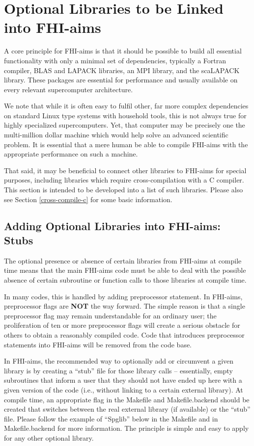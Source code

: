 \chapter{Optional Libraries to be Linked into FHI-aims}
\label{appendix_external_packages_and_variants}

A core principle for FHI-aims is that it should be possible to build
all essential functionality with only a minimal set of dependencies,
typically a Fortran compiler, BLAS and LAPACK libraries, an MPI
library, and the scaLAPACK library. These packages are essential for
performance and usually available on every relevant supercomputer
architecture. 

We note that while it is often easy to fulfil other,
far more complex dependencies on standard Linux type systems with
household tools, this is not always true for highly specialized
supercomputers. Yet, that computer may be precisely one the
multi-million dollar machine which would help solve an advanced
scientific problem. It is essential that a mere human be able to
compile FHI-aims with the appropriate performance on such a machine. 

That said, it may be beneficial to connect other libraries to FHI-aims
for special purposes, including libraries which require
cross-compilation with a C compiler. This section is intended to be
developed into a list of such libraries. Please also see Section
\ref{cross-compile-c} for some basic information.

\section{Adding Optional Libraries into FHI-aims: Stubs}

The optional presence or absence of certain libraries from FHI-aims at
compile time means that the main FHI-aims code must be able to deal
with the possible absence of certain subroutine or function calls to
those libraries at compile time.

In many codes, this is handled by adding preprocessor statement. In
FHI-aims, preprocessor flags are \textbf{NOT} the way forward. The
simple reason is that a single preprocessor flag may remain
understandable for an ordinary user; the proliferation of ten or more
preprocessor flags will create a serious obstacle for others to obtain
a reasonably compiled code. Code that introduces preprocessor
statements into FHI-aims will be removed from the code base.  

In FHI-aims, the recommended way to optionally add or circumvent a
given library is by creating a ``stub'' file for those library calls
-- essentially, empty subroutines that inform a user that they should
not have ended up here with a given version of the code (i.e., without
linking to a certain external library). At compile time, an
appropriate flag in the Makefile and Makefile.backend should be
created that switches between the real external library (if available)
or the ``stub'' file. Please follow the example of ``Spglib'' below in
the Makefile and in Makefile.backend for more information. The
principle is simple and easy to apply for any other optional library.

